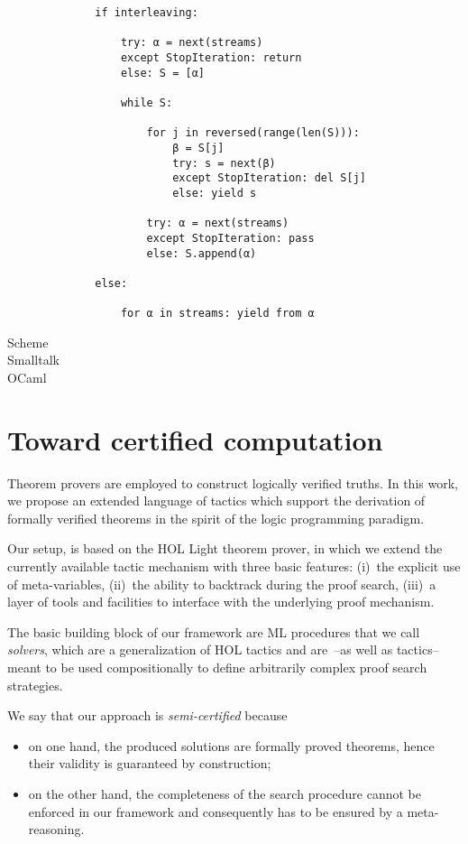 \begin{description}
\begin{verbatim}
        if interleaving:

            try: α = next(streams)
            except StopIteration: return
            else: S = [α]

            while S:

                for j in reversed(range(len(S))):
                    β = S[j]
                    try: s = next(β)
                    except StopIteration: del S[j]
                    else: yield s

                try: α = next(streams)
                except StopIteration: pass
                else: S.append(α)

        else:

            for α in streams: yield from α

    \end{verbatim}
\item[Scheme]    
\item[Smalltalk]    
\item[OCaml]    
\end{description}

\section{Toward certified computation}
\label{sec:introduction}

Theorem provers are employed to construct logically verified truths.
In this work, we propose an extended language of tactics which support
the derivation of formally verified theorems in the spirit of the
logic programming paradigm.

Our setup, is based on the HOL Light theorem prover, in which we
extend the currently available tactic mechanism with three basic
features: (i)~the explicit use of meta-variables, (ii)~the ability to
backtrack during the proof search, (iii)~a layer of tools and
facilities to interface with the underlying proof mechanism.

The basic building block of our framework are ML procedures that we
call \emph{solvers}, which are a generalization of HOL tactics and
are~--as well as tactics-- meant to be used compositionally to define
arbitrarily complex proof search strategies.

We say that our approach is \emph{semi-certified} because
\begin{itemize}
\item on one hand, the produced solutions are formally proved
  theorems, hence their validity is guaranteed by construction;
\item on the other hand, the completeness of the search procedure
  cannot be enforced in our framework and consequently has to be
  ensured by a meta-reasoning.
\end{itemize}

